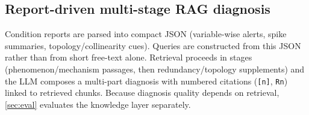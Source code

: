 \subsection{Report-driven multi-stage RAG diagnosis}
\label{sec:rag-diag}
Condition reports are parsed into compact JSON (variable-wise alerts, spike summaries,
topology/collinearity cues).
Queries are constructed from this JSON rather than from short free-text alone.
Retrieval proceeds in stages (phenomenon/mechanism passages, then redundancy/topology supplements)
and the LLM composes a multi-part diagnosis with numbered citations (\texttt{[n]}, \texttt{Rn}) linked
to retrieved chunks.
Because diagnosis quality depends on retrieval, \cref{sec:eval} evaluates the knowledge layer
separately.
